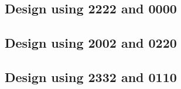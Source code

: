 \subsection{Design using 2222 and 0000}


 \begin{center}




 \end{center}



\subsection{Design using 2002 and 0220}


 \begin{center}




 \end{center}



\subsection{Design using 2332 and 0110}


 \begin{center}




 \end{center}




